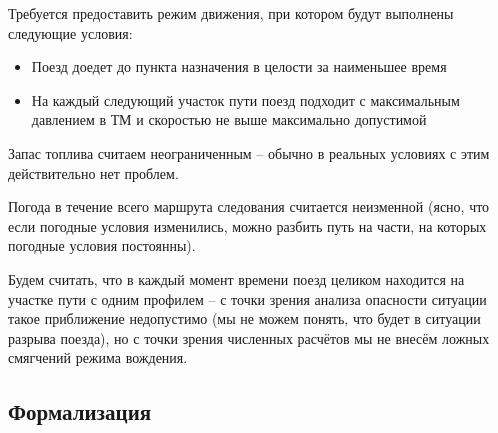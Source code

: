 Требуется предоставить режим движения, при котором будут выполнены следующие условия:
\begin{itemize}
\item Поезд доедет до пункта назначения в целости за наименьшее время
\item На каждый следующий участок пути поезд подходит с максимальным давлением в ТМ и скоростью не выше максимально допустимой
\end{itemize}


Запас топлива считаем неограниченным -- обычно в реальных условиях с этим действительно нет проблем.

Погода в течение всего маршрута следования считается неизменной (ясно, что если погодные условия изменились, можно разбить путь на части, на которых погодные условия постоянны).

Будем считать, что в каждый момент времени поезд целиком находится на участке пути с одним профилем -- с точки зрения анализа опасности ситуации такое приближение недопустимо (мы не можем понять, что будет в ситуации разрыва поезда), но с точки зрения численных расчётов мы не внесём ложных смягчений режима вождения.

\subsection{Формализация}
